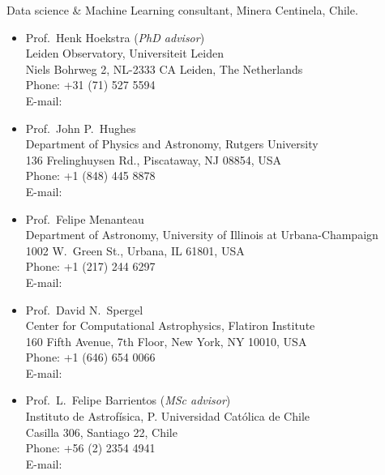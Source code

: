 \documentclass[11pt]{article}
\begin{document}



\noindent
{} Data science \& Machine Learning consultant, Minera Centinela, Chile.\\



\begin{itemize}
\item Prof.~Henk Hoekstra (\textit{PhD advisor})\\
      Leiden Observatory, Universiteit Leiden\\
      Niels Bohrweg 2, NL-2333 CA Leiden, The Netherlands\\
      Phone: +31 (71) 527 5594\\
      E-mail: 
\item Prof.~John P.~Hughes\\
      Department of Physics and Astronomy, Rutgers University\\
      136 Frelinghuysen Rd., Piscataway, NJ 08854, USA\\
      Phone: +1 (848) 445 8878\\
      E-mail: 
\item Prof.~Felipe Menanteau\\
      Department of Astronomy, University of Illinois at Urbana-Champaign\\
      1002 W.\ Green St., Urbana, IL 61801, USA\\
      Phone: +1 (217) 244 6297\\
      E-mail: 
\item Prof.~David N.~Spergel\\
      Center for Computational Astrophysics, Flatiron Institute\\
      160 Fifth Avenue, 7th Floor, New York, NY 10010, USA\\
      Phone: +1 (646) 654 0066\\
      E-mail: 
\item Prof.~L.~Felipe Barrientos (\textit{MSc advisor})\\
      Instituto de Astrof\'isica, P. Universidad Cat\'olica de Chile\\
      Casilla 306, Santiago 22, Chile\\
      Phone: +56 (2) 2354 4941\\
      E-mail: 
\end{itemize}
\end{document}
